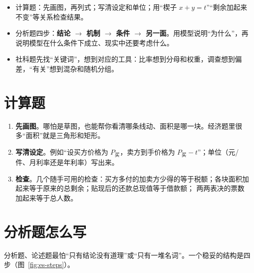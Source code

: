 
\begin{keypoints}
\begin{itemize}
  \item 计算题：先画图，再列式；写清设定和单位；用“楔子 $x+y=t$”“剩余加起来不变”等关系检查结果。
  \item 分析题四步：\textbf{结论 $\to$ 机制 $\to$ 条件 $\to$ 另一面}。用模型说明“为什么”，再说明模型在什么条件下成立、现实中还要考虑什么。
  \item 社科题先找“关键词”，想到对应的工具：比率想到分母和权重，调查想到偏差，“有关”想到混杂和随机分组。
\end{itemize}
\end{keypoints}

\section{计算题}

\begin{enumerate}
  \item \textbf{先画图}。哪怕是草图，也能帮你看清哪条线动、面积是哪一块。经济题里很多“面积”就是三角形和矩形。
  \item \textbf{写清设定}。例如“设买方价格为 $P_{\text{买}}$，卖方到手价格为 $P_{\text{买}}-t$”；单位（元/件、月利率还是年利率）写出来。
  \item \textbf{检查}。几个随手可用的检查：买方多付的加卖方少得的等于税额；各块面积加起来等于原来的总剩余；贴现后的还款总现值等于借款额；
        两两表决的票数加起来等于总人数。
\end{enumerate}

\section{分析题怎么写}

分析题、论述题最怕“只有结论没有道理”或“只有一堆名词”。一个稳妥的结构是四步（图~\ref{fig:es-steps}）。

